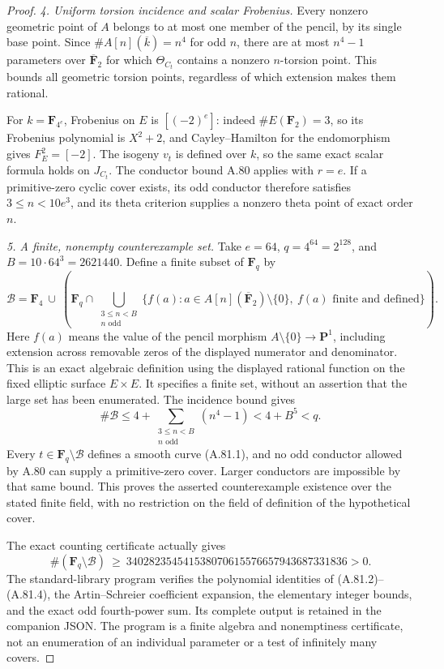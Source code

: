 \documentclass[11pt]{article}
\begin{document}
\begin{proof}
\emph{4. Uniform torsion incidence and scalar Frobenius.}
Every nonzero geometric point of $A$ belongs to at most
one member of the pencil, by its single base point.
Since $\#A[n](\overline k)=n^4$ for odd $n$, there are
at most $n^4-1$ parameters over $\overline{\mathbf F}_2$
for which $\Theta_{C_t}$ contains a nonzero $n$-torsion point.
This bounds all geometric torsion points, regardless of
which extension makes them rational.

For $k=\mathbf F_{4^e}$, Frobenius on $E$ is $[(-2)^e]$:
indeed $\#E(\mathbf F_2)=3$, so its Frobenius
polynomial is $X^2+2$, and Cayley--Hamilton for the
endomorphism gives $F_E^2=[-2]$.
The isogeny $v_t$ is defined over $k$, so the same exact
scalar formula holds on $J_{C_t}$. The conductor bound
A.80 applies with $r=e$. If a primitive-zero cyclic cover
exists, its odd conductor therefore satisfies $3\le n<10e^3$,
and its theta criterion supplies a nonzero theta point
of exact order $n$.

\emph{5. A finite, nonempty counterexample set.}
Take $e=64$, $q=4^{64}=2^{128}$, and $B=10\cdot64^3=2621440$.
Define a finite subset of $\mathbf F_q$ by
\[
 \mathcal B=\mathbf F_4\ \cup\
 \left(\mathbf F_q\cap
 \bigcup_{\substack{3\le n<B\\ n\text{ odd}}}
 \{f(a):a\in A[n](\overline{\mathbf F}_2)\setminus\{0\},
                         \ f(a)\text{ finite and defined}\}\right).
                                                               \tag{A.81.6}
\]
Here $f(a)$ means the value of the pencil morphism
$A\setminus\{0\}\to\mathbf P^1$, including extension across
removable zeros of the displayed numerator and denominator.
This is an exact algebraic definition using the displayed
rational function on the fixed elliptic surface $E\times E$.
It specifies a finite set, without an assertion that the
large set has been enumerated. The incidence bound gives
\[
 \#\mathcal B\le4+
       \sum_{\substack{3\le n<B\\ n\text{ odd}}}(n^4-1)<4+B^5<q.
\]
Every $t\in\mathbf F_q\setminus\mathcal B$ defines a
smooth curve (A.81.1), and no odd conductor allowed by
A.80 can supply a primitive-zero cover. Larger conductors
are impossible by that same bound. This proves the
asserted counterexample existence over the stated finite
field, with no restriction on the field of definition of
the hypothetical cover.

The exact counting certificate actually gives
\[
 \#(\mathbf F_q\setminus\mathcal B)\ \ge\
       340282354541538070615576657943687331836>0.
\]
The standard-library program
verifies the polynomial identities of (A.81.2)--(A.81.4),
the Artin--Schreier coefficient expansion, the elementary
integer bounds, and the exact odd fourth-power sum.
Its complete output is retained in the companion JSON.
The program is a finite algebra and nonemptiness certificate,
not an enumeration of an individual parameter or a test
of infinitely many covers.


\end{proof}
\end{document}
